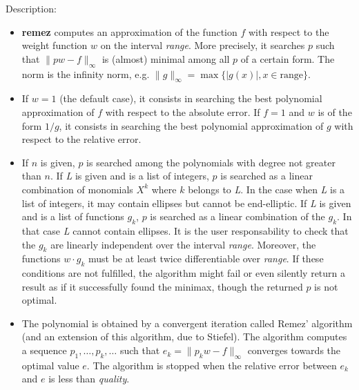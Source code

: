 \noindent Description: \begin{itemize}

\item \textbf{remez} computes an approximation of the function $f$ with respect to
   the weight function $w$ on the interval \emph{range}. More precisely, it
   searches $p$ such that $\|pw-f\|_{\infty}$ is
   (almost) minimal among all $p$ of a certain form. The norm is
   the infinity norm, e.g. $\|g\|_{\infty} = \max \{|g(x)|, x \in \mathrm{range}\}.$

\item If $w=1$ (the default case), it consists in searching the best
   polynomial approximation of $f$ with respect to the absolute error.
   If $f=1$ and $w$ is of the form $1/g$, it consists in
   searching the best polynomial approximation of $g$ with respect to the
   relative error.

\item If $n$ is given, $p$ is searched among the polynomials with degree not
   greater than $n$.
   If \emph{L} is given and is a list of integers, $p$ is searched as a linear
   combination of monomials $X^k$ where $k$ belongs to \emph{L}.
   In the case when \emph{L} is a list of integers, it may contain ellipses but
   cannot be end-elliptic.
   If \emph{L} is given and is a list of functions $g_k$, $p$ is searched as a
   linear combination of the $g_k$. In that case \emph{L} cannot contain ellipses.
   It is the user responsability to check that the $g_k$ are linearly independent
   over the interval \emph{range}. Moreover, the functions $w\cdot g_k$ must be at least
   twice differentiable over \emph{range}. If these conditions are not fulfilled, the
   algorithm might fail or even silently return a result as if it successfully
   found the minimax, though the returned $p$ is not optimal.

\item The polynomial is obtained by a convergent iteration called Remez'
   algorithm (and an extension of this algorithm, due to Stiefel).
   The algorithm computes a sequence $p_1,\dots ,p_k,\dots$
   such that $e_k = \|p_k w-f\|_{\infty}$ converges towards
   the optimal value $e$. The algorithm is stopped when the relative error
   between $e_k$ and $e$ is less than \emph{quality}.


\end{itemize}
